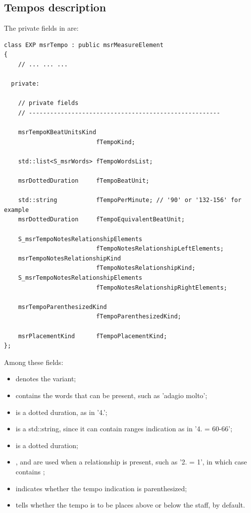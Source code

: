 \subsection{Tempos description}\label{Tempos description}

The private fields in  are:
\begin{lstlisting}[language=CPlusPlus]
class EXP msrTempo : public msrMeasureElement
{
	// ... ... ...

  private:

    // private fields
    // ------------------------------------------------------

    msrTempoKBeatUnitsKind
                          fTempoKind;

    std::list<S_msrWords> fTempoWordsList;

    msrDottedDuration     fTempoBeatUnit;

    std::string           fTempoPerMinute; // '90' or '132-156' for example
    msrDottedDuration     fTempoEquivalentBeatUnit;

    S_msrTempoNotesRelationshipElements
                          fTempoNotesRelationshipLeftElements;
    msrTempoNotesRelationshipKind
                          fTempoNotesRelationshipKind;
    S_msrTempoNotesRelationshipElements
                          fTempoNotesRelationshipRightElements;

    msrTempoParenthesizedKind
                          fTempoParenthesizedKind;

    msrPlacementKind      fTempoPlacementKind;
};
\end{lstlisting}

Among these fields:
\begin{itemize}
\item {} denotes the variant;
\item {} contains the words that can be present, such as 'adagio molto';
\item {} is a dotted duration, as in '4.';
\item {} is a std::string, since it can contain ranges indication as in '4. = 60-66';
\item {} is a dotted duration; %
\item {},  and  are used when a relationship is present, such as '2. = 1', in which case  contains ;
\item {} indicates whether the tempo indication is parenthesized;
\item {} tells whether the tempo is to be places above or below the staff,  by default.
\end{itemize}


